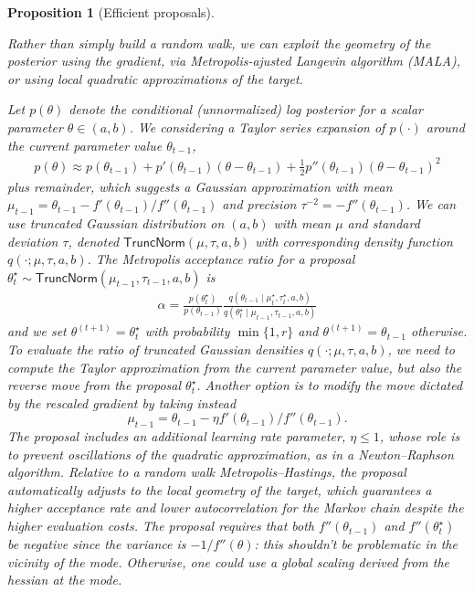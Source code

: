 \documentclass[
  11pt,
  letterpaper,
]{scrbook}
\theoremstyle{definition}
\theoremstyle{definition}
\theoremstyle{definition}
\theoremstyle{plain}
\newtheorem{proposition}{Proposition}[chapter]
\theoremstyle{remark}
\begin{document}
\begin{proposition}[Efficient
proposals]\protect\hypertarget{prp-mala}{}\label{prp-mala}

Rather than simply build a random walk, we can exploit the geometry of
the posterior using the gradient, via Metropolis-ajusted Langevin
algorithm (MALA), or using local quadratic approximations of the target.

Let \(p(\theta)\) denote the conditional (unnormalized) log posterior
for a scalar parameter \(\theta \in (a, b)\). We considering a Taylor
series expansion of \(p(\cdot)\) around the current parameter value
\(\theta_{t-1}\), \begin{align*}
 p(\theta) \approx p(\theta_{t-1}) + p'(\theta_{t-1})(\theta - \theta_{t-1}) + \frac{1}{2} p''(\theta_{t-1})(\theta - \theta_{t-1})^2
\end{align*} plus remainder, which suggests a Gaussian approximation
with mean
\(\mu_{t-1} = \theta_{t-1} - f'(\theta_{t-1})/f''(\theta_{t-1})\) and
precision \(\tau^{-2} = -f''(\theta_{t-1})\). We can use truncated
Gaussian distribution on \((a, b)\) with mean \(\mu\) and standard
deviation \(\tau\), denoted \(\mathsf{TruncNorm}(\mu, \tau, a, b)\) with
corresponding density function \(q(\cdot; \mu, \tau, a, b)\). The
Metropolis acceptance ratio for a proposal
\(\theta^{\star}_{t} \sim \mathsf{TruncNorm}(\mu_{t-1}, \tau_{t-1}, a, b)\)
is \begin{align*}
 \alpha = \frac{p(\theta^{\star}_{t})}{p(\theta_{t-1})} \frac{ q(\theta_{t-1} \mid \mu_{t}^{\star}, \tau_{t}^{\star}, a, b)}{q(\theta^{\star}_{t} \mid \mu_{t-1}, \tau_{t-1}, a, b)}
\end{align*} and we set \(\theta^{(t+1)} = \theta^{\star}_{t}\) with
probability \(\min\{1, r\}\) and \(\theta^{(t+1)} = \theta_{t-1}\)
otherwise. To evaluate the ratio of truncated Gaussian densities
\(q(\cdot; \mu, \tau, a, b)\), we need to compute the Taylor
approximation from the current parameter value, but also the reverse
move from the proposal \(\theta^{\star}_{t}\). Another option is to
modify the move dictated by the rescaled gradient by taking instead
\[\mu_{t-1} = \theta_{t-1} - \eta f'(\theta_{t-1})/f''(\theta_{t-1}).\]
The proposal includes an additional learning rate parameter,
\(\eta \leq 1\), whose role is to prevent oscillations of the quadratic
approximation, as in a Newton--Raphson algorithm. Relative to a random
walk Metropolis--Hastings, the proposal automatically adjusts to the
local geometry of the target, which guarantees a higher acceptance rate
and lower autocorrelation for the Markov chain despite the higher
evaluation costs. The proposal requires that both \(f''(\theta_{t-1})\)
and \(f''(\theta^{\star}_{t})\) be negative since the variance is
\(-1/f''(\theta)\): this shouldn't be problematic in the vicinity of the
mode. Otherwise, one could use a global scaling derived from the hessian
at the mode.


\end{proposition}
\end{document}
